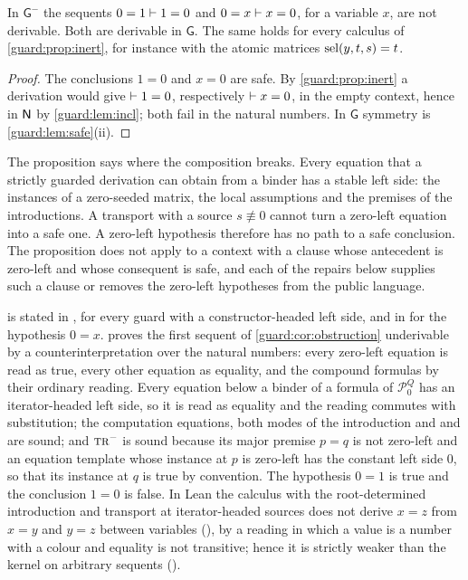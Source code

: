 \begin{corollary}
\label{guard:cor:obstruction}
In $\mathsf G^{-}$ the sequents $0=1\vdash 1=0$ and $0=x\vdash x=0$, for a
variable $x$, are not derivable.  Both are derivable in $\mathsf G$.  The
same holds for every calculus of \cref{guard:prop:inert}, for instance with
the atomic matrices $\operatorname{sel}(y,t,s)=t$.
\end{corollary}

\begin{proof}
The conclusions $1=0$ and $x=0$ are safe.  By \cref{guard:prop:inert} a
derivation would give $\vdash 1=0$, respectively $\vdash x=0$, in the
empty context, hence in $\mathsf{N}$ by \cref{guard:lem:incl}; both fail in the
natural numbers.  In $\mathsf G$ symmetry is \cref{guard:lem:safe}(ii).
\end{proof}

The proposition says where the composition breaks.  Every equation that a
strictly guarded derivation can obtain from a binder has a stable left
side: the instances of a zero-seeded matrix, the local assumptions and the
premises of the introductions.  A transport with a source $s\not\equiv 0$
cannot turn a zero-left equation into a safe one.  A zero-left hypothesis
therefore has no path to a safe conclusion.  The proposition does not apply
to a context with a clause whose antecedent is zero-left and whose
consequent is safe, and each of the repairs below supplies such a clause or
removes the zero-left hypotheses from the public language.

\begin{remark}
\label{guard:rem:obstruction-versions}
 is stated in , for every guard
with a constructor-headed left side, and in  for the
hypothesis $0=x$.   proves the first sequent
of \cref{guard:cor:obstruction} underivable by a counterinterpretation over
the natural numbers: every zero-left equation is read as true, every other
equation as equality, and the compound formulas by their ordinary reading.
Every equation below a binder of a formula of $\mathcal P_0^{Q}$ has an
iterator-headed left side, so it is read as equality and the reading
commutes with substitution; the computation equations, both modes of the
introduction and  and  are sound; and
$\rulename{Tr}^{-}$ is sound because its major premise $p=q$ is not
zero-left and an equation template whose instance at $p$ is zero-left has
the constant left side $0$, so that its instance at $q$ is true by
convention.  The hypothesis $0=1$ is true and the conclusion $1=0$ is false.
In Lean the calculus  with the root-determined introduction and
transport at iterator-headed sources does not derive $x=z$ from $x=y$ and
$y=z$ between variables (), by a reading in which a
value is a number with a colour and equality is not transitive; hence it is
strictly weaker than the kernel on arbitrary sequents
().
\end{remark}

